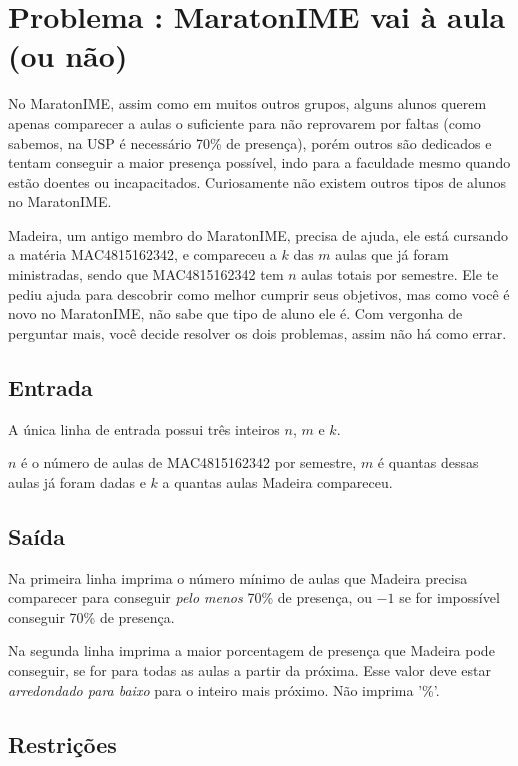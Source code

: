 \section*{Problema \proxLetra: MaratonIME vai à aula (ou não)}

No MaratonIME, assim como em muitos outros grupos, alguns alunos querem apenas comparecer a aulas o suficiente para não reprovarem por faltas (como sabemos, na USP é necessário 70\% de presença), porém outros são dedicados e tentam conseguir a maior presença possível, indo para a faculdade mesmo quando estão doentes ou incapacitados. Curiosamente não existem outros tipos de alunos no MaratonIME.

Madeira, um antigo membro do MaratonIME, precisa de ajuda, ele está cursando a matéria MAC4815162342, e compareceu a $k$ das $m$ aulas que já foram ministradas, sendo que MAC4815162342 tem $n$ aulas totais por semestre. Ele te pediu ajuda para descobrir como melhor cumprir seus objetivos, mas como você é novo no MaratonIME, não sabe que tipo de aluno ele é. Com vergonha de perguntar mais, você decide resolver os dois problemas, assim não há como errar.


\subsection*{Entrada}

A única linha de entrada possui três inteiros $n$, $m$ e $k$.

$n$ é o número de aulas de MAC4815162342 por semestre, $m$ é quantas dessas aulas já foram dadas e $k$ a quantas aulas Madeira compareceu.

\subsection*{Saída}

Na primeira linha imprima o número mínimo de aulas que Madeira precisa comparecer para conseguir \emph{pelo menos} 70\% de presença, ou $-1$ se for impossível conseguir 70\% de presença.

Na segunda linha imprima a maior porcentagem de presença que Madeira pode conseguir, se for para todas as aulas a partir da próxima. Esse valor deve estar \emph{arredondado para baixo} para o inteiro mais próximo. Não imprima '\%'.


\subsection*{Restrições}

